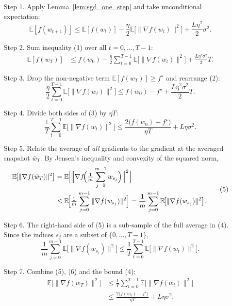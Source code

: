 \documentclass{article}
\newcommand{\E}{\mathbb{E}}
\begin{document}
\begin{enumerate}
\item[Step 1.] Apply Lemma~\ref{lem:sgd_one_step} and take unconditional expectation:
\[
    \E[f(w_{t+1})]\le \E[f(w_t)]-\frac{\eta}{2}\E\!\bigl[\|\nabla f(w_t)\|^2\bigr]+\frac{L\eta^2}{2}\sigma^2 .
\tag{1}
\]

\item[Step 2.] Sum inequality (1) over all $t=0,\dots,T-1$:
\[
\begin{aligned}
    \E[f(w_T)] &\le f(w_0)-\frac{\eta}{2}\sum_{t=0}^{T-1}\E\!\bigl[\|\nabla f(w_t)\|^2\bigr]
                 +\frac{L\eta^2\sigma^2}{2}T .
\end{aligned}
\tag{2}
\]

\item[Step 3.] Drop the non‑negative term $\E[f(w_T)]\ge f^\star$ and rearrange (2):
\[
    \frac{\eta}{2}\sum_{t=0}^{T-1}\E\!\bigl[\|\nabla f(w_t)\|^2\bigr]
    \le f(w_0)-f^\star+\frac{L\eta^2\sigma^2}{2}T .
\tag{3}
\]

\item[Step 4.] Divide both sides of (3) by $\eta T$:
\[
    \frac{1}{T}\sum_{t=0}^{T-1}\E\!\bigl[\|\nabla f(w_t)\|^2\bigr]
    \le \frac{2\bigl(f(w_0)-f^\star\bigr)}{\eta T}
       +L\eta\sigma^2 .
\tag{4}
\]

\item[Step 5.] Relate the average of \emph{all} gradients to the gradient at the averaged snapshot $\bar w_T$. By Jensen’s inequality and convexity of the squared norm,
\[
\begin{aligned}
    \E\!\bigl[\|\nabla f(\bar w_T)\|^2\bigr]
    &=\E\!\Bigl[\Bigl\|\nabla f\!\Bigl(\tfrac{1}{m}\sum_{j=0}^{m-1} w_{s_j}\Bigr)\Bigr\|^2\Bigr]  \\
    &\le \E\!\Bigl[\tfrac{1}{m}\sum_{j=0}^{m-1}\|\nabla f(w_{s_j})\|^2\Bigr]
      =\frac{1}{m}\sum_{j=0}^{m-1}\E\!\bigl[\|\nabla f(w_{s_j})\|^2\bigr] .
\end{aligned}
\tag{5}
\]

\item[Step 6.] The right‑hand side of (5) is a sub‑sample of the full average in (4). Since the indices $s_j$ are a subset of $\{0,\dots,T-1\}$,
\[
    \frac{1}{m}\sum_{j=0}^{m-1}\E\!\bigl[\|\nabla f(w_{s_j})\|^2\bigr]
    \le \frac{1}{T}\sum_{t=0}^{T-1}\E\!\bigl[\|\nabla f(w_t)\|^2\bigr] .
\tag{6}
\]

\item[Step 7.] Combine (5), (6) and the bound (4):
\[
\begin{aligned}
    \E\!\bigl[\|\nabla f(\bar w_T)\|^2\bigr]
    &\le \frac{1}{T}\sum_{t=0}^{T-1}\E\!\bigl[\|\nabla f(w_t)\|^2\bigr] \\
    &\le \frac{2\bigl(f(w_0)-f^\star\bigr)}{\eta T}+L\eta\sigma^2 .
\end{aligned}
\tag{7}
\]


\end{enumerate}
\end{document}
